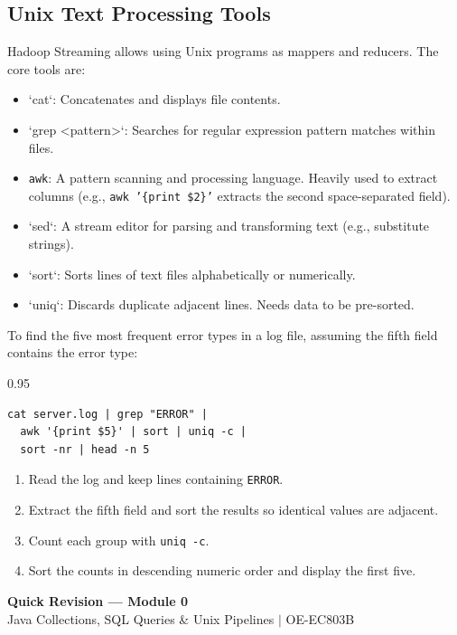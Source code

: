 \documentclass[12pt,a4paper]{article}
\begin{document}
\subsection{Unix Text Processing Tools}
Hadoop Streaming allows using Unix programs as mappers and reducers. The core tools are:
\begin{itemize}[leftmargin=*, itemsep=3pt]
  \item `cat`: Concatenates and displays file contents.
  \item `grep <pattern>`: Searches for regular expression pattern matches within files.
  \item \texttt{awk}: A pattern scanning and processing language. Heavily used to extract columns (e.g., \texttt{awk '\{print \$2\}'} extracts the second space-separated field).
  \item `sed`: A stream editor for parsing and transforming text (e.g., substitute strings).
  \item `sort`: Sorts lines of text files alphabetically or numerically.
  \item `uniq`: Discards duplicate adjacent lines. Needs data to be pre-sorted.
\end{itemize}

\begin{tcolorbox}[examplebox, title={Common UNIX Text Processing Pipeline}]
To find the five most frequent error types in a log file, assuming the fifth field contains the error type:
\begin{spacing}{0.95}
\begin{verbatim}
cat server.log | grep "ERROR" |
  awk '{print $5}' | sort | uniq -c |
  sort -nr | head -n 5
\end{verbatim}
\end{spacing}
\begin{enumerate}[leftmargin=*, itemsep=2pt, topsep=3pt]
  \item Read the log and keep lines containing \texttt{ERROR}.
  \item Extract the fifth field and sort the results so identical values are adjacent.
  \item Count each group with \texttt{uniq -c}.
  \item Sort the counts in descending numeric order and display the first five.
\end{enumerate}
\end{tcolorbox}

\newpage

\begin{center}
  {\large\bfseries\color{myred} Quick Revision --- Module 0}\\[3pt]
  {\small\color{mydark} Java Collections, SQL Queries \& Unix Pipelines $|$ OE-EC803B}
\end{center}
\noindent{\color{myred}\rule{\linewidth}{1.2pt}}
\vspace{8pt}
\end{document}
